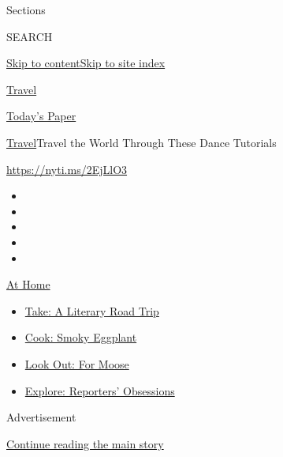 Sections

SEARCH

\protect\hyperlink{site-content}{Skip to
content}\protect\hyperlink{site-index}{Skip to site index}

\href{https://www.nytimes.com/section/travel}{Travel}

\href{https://myaccount.nytimes.com/auth/login?response_type=cookie\&client_id=vi}{}

\href{https://www.nytimes.com/section/todayspaper}{Today's Paper}

\href{/section/travel}{Travel}\textbar{}Travel the World Through These
Dance Tutorials

\url{https://nyti.ms/2EjLlO3}

\begin{itemize}
\item
\item
\item
\item
\item
\end{itemize}

\href{https://www.nytimes.com/spotlight/at-home?action=click\&pgtype=Article\&state=default\&region=TOP_BANNER\&context=at_home_menu}{At
Home}

\begin{itemize}
\tightlist
\item
  \href{https://www.nytimes.com/2020/07/28/books/time-for-a-literary-road-trip.html?action=click\&pgtype=Article\&state=default\&region=TOP_BANNER\&context=at_home_menu}{Take:
  A Literary Road Trip}
\item
  \href{https://www.nytimes.com/2020/07/29/magazine/bored-with-your-home-cooking-some-smoky-eggplant-will-fix-that.html?action=click\&pgtype=Article\&state=default\&region=TOP_BANNER\&context=at_home_menu}{Cook:
  Smoky Eggplant}
\item
  \href{https://www.nytimes.com/2020/07/27/travel/moose-michigan-isle-royale.html?action=click\&pgtype=Article\&state=default\&region=TOP_BANNER\&context=at_home_menu}{Look
  Out: For Moose}
\item
  \href{https://www.nytimes.com/interactive/2020/at-home/even-more-reporters-editors-diaries-lists-recommendations.html?action=click\&pgtype=Article\&state=default\&region=TOP_BANNER\&context=at_home_menu}{Explore:
  Reporters' Obsessions}
\end{itemize}

Advertisement

\protect\hyperlink{after-top}{Continue reading the main story}

